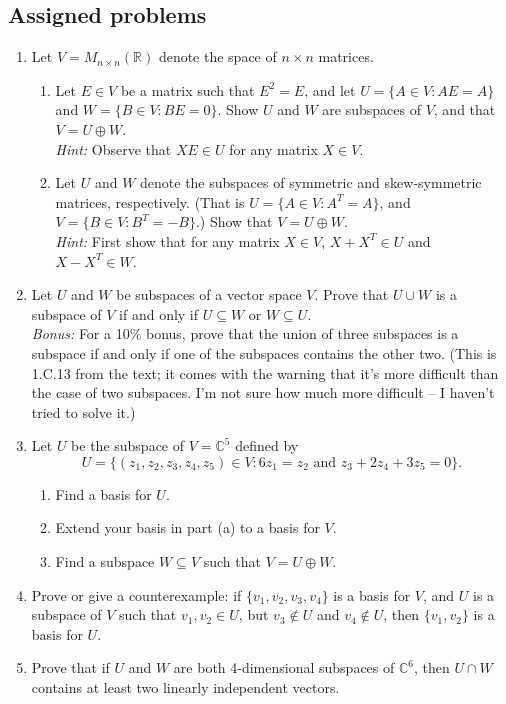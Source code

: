 \documentclass[letterpaper,12pt]{article}
\newcommand{\R}{\mathbb{R}}
\newcommand{\C}{\mathbb{C}}
\begin{document}
\subsection*{Assigned problems}
\begin{enumerate}
 \item Let $V = M_{n\times n}(\R)$ denote the space of $n\times n$ matrices.
 \begin{enumerate}
 \item Let $E\in V$ be a matrix such that $E^2=E$, and let $U=\{A\in V : AE=A\}$ and $W = \{B\in V : BE = 0\}$. Show $U$ and $W$ are subspaces of $V$, and that $V=U\oplus W$.\\
 {\em Hint:} Observe that $XE\in U$ for any matrix $X\in V$.
 \item Let $U$ and $W$ denote the subspaces of symmetric and skew-symmetric matrices, respectively. (That is $U=\{A\in V : A^T=A\}$, and $V=\{B\in V : B^T = -B\}$.) Show that $V = U\oplus W$.\\
 {\em Hint:} First show that for any matrix $X\in V$, $X+X^T\in U$ and $X-X^T \in W$. 
 \end{enumerate}
 \item Let $U$ and $W$ be subspaces of a vector space $V$. Prove that $U\cup W$ is a subspace of $V$ if and only if $U\subseteq W$ or $W\subseteq U$.\\
 {\em Bonus:} For a 10\% bonus, prove that the union of three subspaces is a subspace if and only if one of the subspaces contains the other two. (This is 1.C.13 from the text; it comes with the warning that it's more difficult than the case of two subspaces. I'm not sure how much more difficult -- I haven't tried to solve it.)
 \item Let $U$ be the subspace of $V=\C^5$ defined by
 \[
 U = \{(z_1,z_2,z_3,z_4,z_5)\in V : 6z_1=z_2 \text{ and } z_3+2z_4+3z_5=0\}.
 \]
 \begin{enumerate}
 \item Find a basis for $U$.
 \item Extend your basis in part (a) to a basis for $V$.
 \item Find a subspace $W\subseteq V$ such that $V=U\oplus W$.
 \end{enumerate}
 \item Prove or give a counterexample: if $\{v_1,v_2,v_3,v_4\}$ is a basis for $V$,  and $U$ is a subspace of $V$ such that $v_1, v_2\in U$, but $v_3\notin U$ and $v_4\notin U$, then $\{v_1,v_2\}$ is a basis for $U$.
 \item Prove that if $U$ and $W$ are both 4-dimensional subspaces of $\C^6$, then $U\cap W$ contains at least two linearly independent vectors.
 \end{enumerate}
\end{document}
